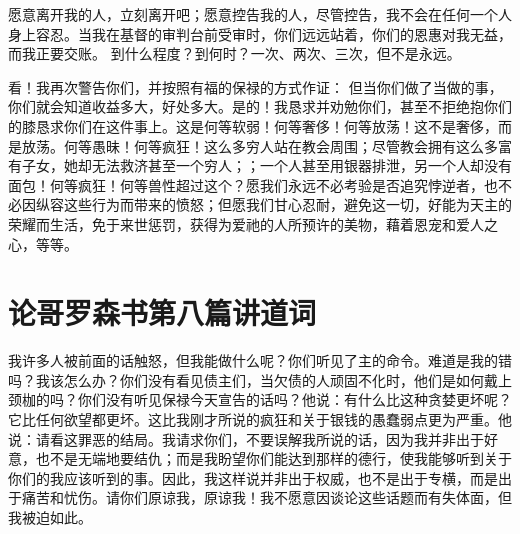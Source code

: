 愿意离开我的人，立刻离开吧；愿意控告我的人，尽管控告，我不会在任何一个人身上容忍。当我在基督的审判台前受审时，你们远远站着，你们的恩惠对我无益，而我正要交账。 到什么程度？到何时？一次、两次、三次，但不是永远。\par

看！我再次警告你们，并按照有福的保禄的方式作证： 但当你们做了当做的事，你们就会知道收益多大，好处多大。是的！我恳求并劝勉你们，甚至不拒绝抱你们的膝恳求你们在这件事上。这是何等软弱！何等奢侈！何等放荡！这不是奢侈，而是放荡。何等愚昧！何等疯狂！这么多穷人站在教会周围；尽管教会拥有这么多富有子女，她却无法救济甚至一个穷人；；一个人甚至用银器排泄，另一个人却没有面包！何等疯狂！何等兽性超过这个？愿我们永远不必考验是否追究悖逆者，也不必因纵容这些行为而带来的愤怒；但愿我们甘心忍耐，避免这一切，好能为天主的荣耀而生活，免于来世惩罚，获得为爱祂的人所预许的美物，藉着恩宠和爱人之心，等等。\par



\section{论哥罗森书第八篇讲道词}

\par

\par

我许多人被前面的话触怒，但我能做什么呢？你们听见了主的命令。难道是我的错吗？我该怎么办？你们没有看见债主们，当欠债的人顽固不化时，他们是如何戴上颈枷的吗？你们没有听见保禄今天宣告的话吗？他说：有什么比这种贪婪更坏呢？它比任何欲望都更坏。这比我刚才所说的疯狂和关于银钱的愚蠢弱点更为严重。他说：请看这罪恶的结局。我请求你们，不要误解我所说的话，因为我并非出于好意，也不是无端地要结仇；而是我盼望你们能达到那样的德行，使我能够听到关于你们的我应该听到的事。因此，我这样说并非出于权威，也不是出于专横，而是出于痛苦和忧伤。请你们原谅我，原谅我！我不愿意因谈论这些话题而有失体面，但我被迫如此。\par

